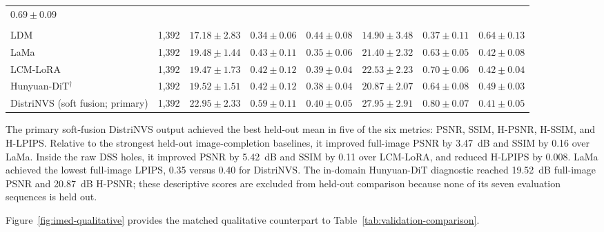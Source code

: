 \documentclass[letterpaper,10pt,conference]{ieeeconf}
\begin{document}
\begin{table}[t]
\begin{tabular}{lccccccc}
$0.69\pm0.09$ \\
\addlinespace
\multicolumn{8}{l}{\textit{Image completion}} \\
LDM~\cite{rombach2022ldm} & 1,392 & $17.18\pm2.83$ & $0.34\pm0.06$ & $0.44\pm0.08$ &
$14.90\pm3.48$ & $0.37\pm0.11$ & $0.64\pm0.13$ \\
LaMa~\cite{suvorov2022lama} & 1,392 & $\underline{19.48\pm1.44}$ & $0.43\pm0.11$ & $\mathbf{0.35\pm0.06}$ &
$21.40\pm2.32$ & $0.63\pm0.05$ & $0.42\pm0.08$ \\
LCM-LoRA~\cite{luo2023lcmlora} & 1,392 & $19.47\pm1.73$ & $0.42\pm0.12$ & $\underline{0.39\pm0.04}$ &
$\underline{22.53\pm2.23}$ & $\underline{0.70\pm0.06}$ & $\underline{0.42\pm0.04}$ \\
Hunyuan-DiT$^\dagger$~\cite{li2024hunyuandit} & 1,392 & $19.52\pm1.51$ & $0.42\pm0.12$ & $0.38\pm0.04$ &
$20.87\pm2.07$ & $0.64\pm0.08$ & $0.49\pm0.03$ \\
\midrule
DistriNVS (soft fusion; primary) & 1,392 & $\mathbf{22.95\pm2.33}$ & $\mathbf{0.59\pm0.11}$ &
$0.40\pm0.05$ & $\mathbf{27.95\pm2.91}$ & $\mathbf{0.80\pm0.07}$ &
$\mathbf{0.41\pm0.05}$ \\
\bottomrule
\end{tabular}
\end{table}

The primary soft-fusion DistriNVS output achieved the best held-out mean in
five of the six metrics: PSNR, SSIM, H-PSNR, H-SSIM, and H-LPIPS. Relative to
the strongest held-out image-completion baselines, it improved full-image PSNR
by 3.47~dB and SSIM by 0.16 over LaMa. Inside the raw DSS holes, it improved
PSNR by 5.42~dB and SSIM by 0.11 over LCM-LoRA, and reduced H-LPIPS by 0.008.
LaMa achieved the lowest full-image LPIPS, 0.35 versus 0.40 for DistriNVS.
The in-domain Hunyuan-DiT diagnostic reached 19.52~dB full-image PSNR and
20.87~dB H-PSNR; these descriptive scores are excluded from held-out
comparison because none of its seven evaluation sequences is held out.

Figure~\ref{fig:imed-qualitative} provides the matched qualitative counterpart
to Table~\ref{tab:validation-comparison}.
\end{document}
